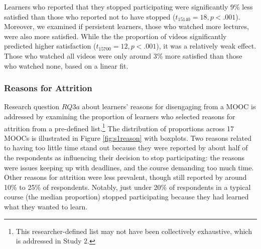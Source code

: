 \documentclass{sigchi}\usepackage[]{graphicx}\usepackage[]{color}
\begin{document}
Learners who reported that they stopped participating were significantly 9\% less satisfied than those who reported not to have stopped ($t_{15140}=18, p<.001$). Moreover, we examined if persistent learners, those who watched more lectures, were also more satisfied. While the the proportion of videos significantly predicted higher satisfaction ($t_{15700}=12, p<.001$), it was a relatively weak effect. Those who watched all videos were only around 3\% more satisfied than those who watched none, based on a linear fit.






\subsubsection{Reasons for Attrition}

Research question $RQ3a$ about learners' reasons for disengaging from a MOOC is addressed by examining the proportion of learners who selected reasons for attrition from a pre-defined list.\footnote{This researcher-defined list may not have been collectively exhaustive, which is addressed in Study 2.} The distribution of proportions across 17 MOOCs is illustrated in Figure \ref{fig:s1reason} with boxplots. Two reasons related to having too little time stand out because they were reported by about half of the respondents as influencing their decision to stop participating: the reasons were issues keeping up with deadlines, and the course demanding too much time. Other reasons for attrition were less prevalent, though still reported by around 10\% to 25\% of respondents. Notably, just under 20\% of respondents in a typical course (the median proportion) stopped participating because they had learned what they wanted to learn.
\end{document}
